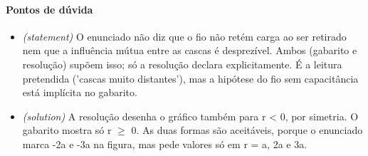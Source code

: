 \documentclass{article}%
\begin{document}
\paragraph{Pontos de dúvida}%
\begin{itemize}%
\item%
\textit{(statement)} O enunciado não diz que o fio não retém carga ao ser retirado nem que a influência mútua entre as cascas é desprezível. Ambos (gabarito e resolução) supõem isso; só a resolução declara explicitamente. É a leitura pretendida ('cascas muito distantes'), mas a hipótese do fio sem capacitância está implícita no gabarito.%
\item%
\textit{(solution)} A resolução desenha o gráfico também para r < 0, por simetria. O gabarito mostra só r $\geq$ 0. As duas formas são aceitáveis, porque o enunciado marca -2a e -3a na figura, mas pede valores só em r = a, 2a e 3a.%
\end{itemize}%
\end{document}
